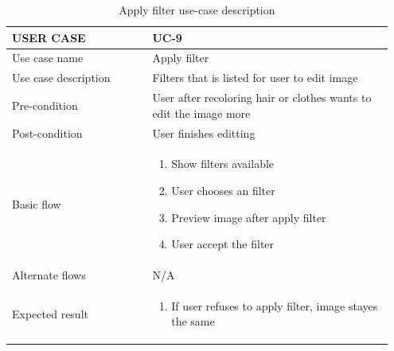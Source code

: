 \begin{center} 
\begin{table} [H]
\caption{Apply filter use-case description} 
\begin{tabular}{p{0.35\linewidth} | p{0.6\linewidth}}
\hline
USER CASE            & UC-9 \\ \hline
Use case name        &  Apply filter  \\ \hline
Use case description &  Filters that is listed for user to edit image    \\\hline
Pre-condition         &   User after recoloring hair or clothes wants to edit the image more  \\ \hline
Post-condition        &   User finishes editting   \\ \hline
Basic flow           &  \begin{enumerate}
    \item Show filters available 
    \item User chooses an filter
    \item Preview image after apply filter
    \item User accept the filter
\end{enumerate}    \\ \hline
Alternate flows      &   N/A   \\ \hline
Expected result      &  \begin{enumerate}
    \item If user refuses to apply filter, image stayes the same
\end{enumerate}     \\ \hline
\end{tabular}
\end{table}
\end{center}

